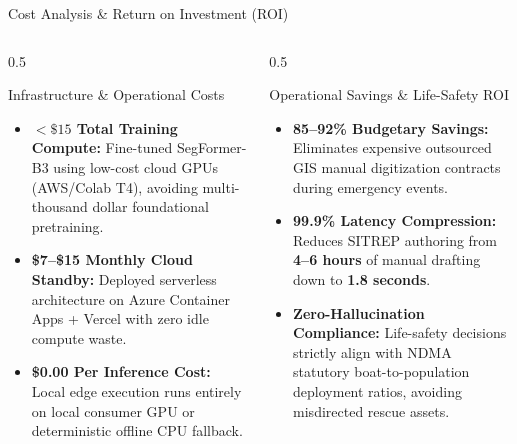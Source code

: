 \documentclass[aspectratio=169, 10pt, professionalfonts]{beamer}
\begin{document}
\begin{frame}{Cost Analysis \& Return on Investment (ROI)}
  \begin{columns}[T]
    \begin{column}{0.5\textwidth}
      \begin{block}{Infrastructure \& Operational Costs}
        \begin{itemize}\setlength{\itemsep}{0.6em}\footnotesize
          \item \textbf{$<\$15$ Total Training Compute:} Fine-tuned SegFormer-B3 using low-cost cloud GPUs (AWS/Colab T4), avoiding multi-thousand dollar foundational pretraining.
          \item \textbf{\$7--\$15 Monthly Cloud Standby:} Deployed serverless architecture on Azure Container Apps + Vercel with zero idle compute waste.
          \item \textbf{\$0.00 Per Inference Cost:} Local edge execution runs entirely on local consumer GPU or deterministic offline CPU fallback.
        \end{itemize}
      \end{block}
    \end{column}
    
    \begin{column}{0.5\textwidth}
      \begin{block}{Operational Savings \& Life-Safety ROI}
        \begin{itemize}\setlength{\itemsep}{0.6em}\footnotesize
          \item \textbf{85--92\% Budgetary Savings:} Eliminates expensive outsourced GIS manual digitization contracts during emergency events.
          \item \textbf{99.9\% Latency Compression:} Reduces SITREP authoring from \textbf{4--6 hours} of manual drafting down to \textbf{1.8 seconds}.
          \item \textbf{Zero-Hallucination Compliance:} Life-safety decisions strictly align with NDMA statutory boat-to-population deployment ratios, avoiding misdirected rescue assets.
        \end{itemize}
      \end{block}
    \end{column}
  \end{columns}
\end{frame}
\end{document}
